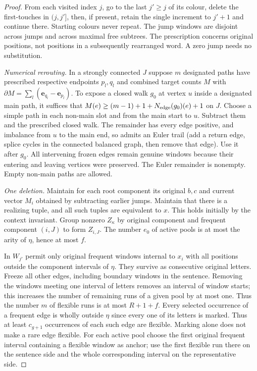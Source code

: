 \documentclass[11pt]{article}
\begin{document}
\begin{proof}
From each visited index $j$, go to the last $j'\ge j$ of its colour, delete
the first-touches in $(j,j']$, then, if present, retain the single increment
to $j'+1$ and continue there. Starting colours never repeat. The jump
windows are disjoint across jumps and across maximal free subtrees.
The prescription concerns original positions, not positions in a subsequently
rearranged word. A zero jump needs no substitution.

\emph{Numerical rerouting.}
In a strongly connected $J$ suppose $m$ designated paths have prescribed
respective endpoints $p_l,q_l$ and combined target counts $M$ with
$\partial M=\sum_l(\mathbf e_{q_l}-\mathbf e_{p_l})$.
To expose a closed walk $g_0$ at vertex $u$ inside a designated main path,
it suffices that $M(e)\ge(m-1)+1+N_{\rm edge}(g_0)(e)+1$ on $J$.
Choose a simple path in each non-main slot and from the main start to $u$.
Subtract them and the prescribed closed walk. The remainder has every
edge positive, and imbalance from $u$ to the main end, so admits an Euler
trail (add a return edge, splice cycles in the connected balanced graph,
then remove that edge). Use it after $g_0$. All intervening frozen edges
remain genuine windows because their entering and leaving vertices were
preserved. The Euler remainder is nonempty. Empty non-main paths are allowed.

\emph{One deletion.}
Maintain for each root component its original $b,c$ and current vector $M_i$
obtained by subtracting earlier jumps. Maintain that there is a realizing
tuple, and all such tuples are equivalent to $x$. This holds initially by
the context invariant. Group nonzero $Z_\kappa$ by original component and
frequent component $(i,J)$ to form $Z_{i,J}$. The number $e_0$ of active
pools is at most the arity of $\eta$, hence at most $f$.

In $W_{j'}$ permit only original frequent windows internal to $x_i$ with
all positions outside the component intervals of $\eta$. They survive as
consecutive original letters. Freeze all other edges, including boundary
windows in the sentence. Removing the windows meeting one interval of
letters removes an interval of window starts; this increases the number of
remaining runs of a given pool by at most one. Thus the number $m$ of
flexible runs is at most $R+1+f$. Every selected occurrence of a frequent
edge is wholly outside $\eta$ since every one of its letters is marked.
Thus at least $c_{g+1}$ occurrences of each such edge are flexible.
Marking alone does not make a rare edge flexible. For each active pool
choose the first original frequent interval containing a flexible window
as anchor; use the first flexible run there on the sentence side and the
whole corresponding interval on the representative side.


\end{proof}
\end{document}
